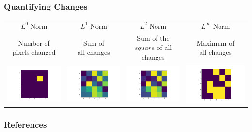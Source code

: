 \documentclass[10pt,usepdftitle=false,aspectratio=169]{beamer}
\begin{document}
\begin{frame}[fragile]
	\frametitle{Quantifying Changes}

	\begin{tabular}{cccc}
		
	$L^0$-Norm & 	$L^1$-Norm & 	$L^2$-Norm & 	$L^\infty$-Norm \vspace{5pt} \\
	
	
	
	\shortstack{Number of \\ pixels changed} & \shortstack{Sum of \\ all changes} & \shortstack{Sum of the $square$ \\ of all changes} & \shortstack{Maximum of \\ all changes} \\
	
	\includegraphics[align=c,width=0.3\columnwidth]{plots/L0.png} &
	\includegraphics[align=c,width=0.3\columnwidth]{plots/L1.png} &
	\includegraphics[align=c,width=0.3\columnwidth]{plots/L2.png} &
	\includegraphics[align=c,width=0.3\columnwidth]{plots/Linf.png} &
	
	\end{tabular}
\end{frame}

\begin{frame}[allowframebreaks]
	\frametitle{References}
	
	
\end{frame}
\end{document}
